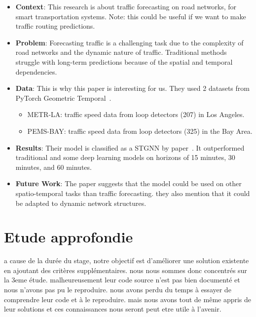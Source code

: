 \documentclass[conference]{IEEEtran}
\begin{document}
    \begin{itemize}
        \item \textbf{Context}:
        This research is about traffic forecasting on road networks, for smart transportation systems.
        Note: this could be useful if we want to make traffic routing predictions.
        \item \textbf{Problem}:
        Forecasting traffic is a challenging task due to the complexity of road networks and the dynamic nature of traffic.
        Traditional methods struggle with long-term predictions because of the spatial and temporal dependencies.
        \item \textbf{Data}:
        This is why this paper is interesting for us.
        They used 2 datasets from PyTorch Geometric Temporal~\cite{rozemberczki2021pytorch}.
        \begin{itemize}
            \item METR-LA: traffic speed data from loop detectors (207) in Los Angeles.
            \item PEMS-BAY: traffic speed data from loop detectors (325) in the Bay Area.
        \end{itemize}
        \item \textbf{Results}:
        Their model is classified as a STGNN by paper~\cite{Wu_2021}.
        It outperformed traditional and some deep learning models on horizons of 15 minutes, 30 minutes, and 60 minutes.
        \item \textbf{Future Work}:
        The paper suggests that the model could be used on other spatio-temporal tasks than traffic forecasting.
        they also mention that it could be adapted to dynamic network structures.
    \end{itemize}


    \section{Etude approfondie}
    a cause de la durée du stage, notre objectif est d'améliorer une solution existente en ajoutant des critères supplémentaires.
    nous nous sommes donc concentrés sur la 3eme étude.
    malheureusement leur code source n'est pas bien documenté et nous n'avons pas pu le reproduire.
    nous avons perdu du temps à essayer de comprendre leur code et à le reproduire.
    mais nous avons tout de même appris de leur solutions et ces connaissances nous seront peut etre utile à l'avenir.

    
    
\end{document}
